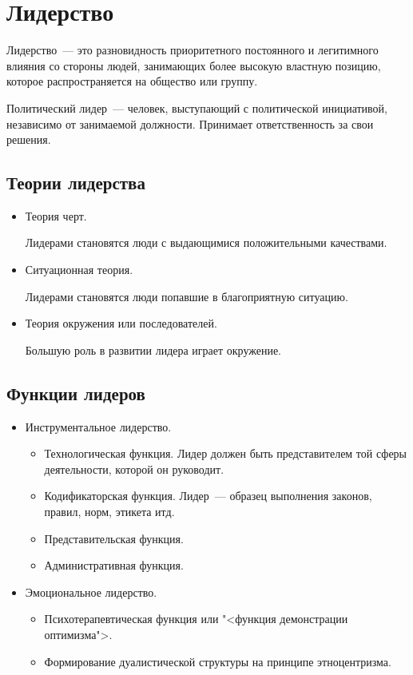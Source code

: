 \section{Лидерство}
Лидерство~--- это разновидность приоритетного постоянного и легитимного влияния со стороны людей, занимающих более высокую властную позицию, которое распространяется на общество или группу.

Политический лидер~--- человек, выступающий с политической инициативой, независимо от занимаемой должности. Принимает ответственность за свои решения.

\subsection{Теории лидерства}
\begin{itemize}
\item Теория черт.

Лидерами становятся люди с выдающимися положительными качествами.
\item Ситуационная теория.

Лидерами становятся люди попавшие в благоприятную ситуацию.

\item Теория окружения или последователей.

Большую роль в развитии лидера играет окружение.
\end{itemize}

\subsection{Функции лидеров}
\begin{itemize}
	\item Инструментальное лидерство.
		\begin{itemize}
			\item Технологическая функция. Лидер должен быть представителем той сферы деятельности, которой он руководит.
			\item Кодификаторская функция. Лидер~--- образец выполнения законов, правил, норм, этикета итд.
			\item Представительская функция.
			\item Административная функция. 
		\end{itemize}
	\item Эмоциональное лидерство.
		\begin{itemize}
			\item Психотерапевтическая функция или "<функция демонстрации оптимизма">.
			\item Формирование дуалистической структуры на принципе этноцентризма.
		\end{itemize}
\end{itemize}

